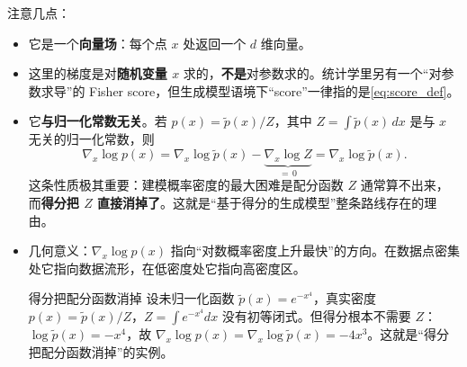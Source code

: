 注意几点：
\begin{itemize}
\item 它是一个\textbf{向量场}：每个点 $x$ 处返回一个 $d$ 维向量。
\item 这里的梯度是对\textbf{随机变量 $x$} 求的，\textbf{不是}对参数求的。统计学里另有一个“对参数求导”的 Fisher score，但生成模型语境下“score”一律指的是\eqref{eq:score_def}。
\item 它\textbf{与归一化常数无关}。若 $p(x) = \tilde{p}(x) / Z$，其中 $Z = \int \tilde p(x)\,dx$ 是与 $x$ 无关的归一化常数，则
\begin{equation}
\nabla_x \log p(x) = \nabla_x \log \tilde{p}(x) - \underbrace{\nabla_x \log Z}_{=\,0} = \nabla_x \log \tilde{p}(x).
\end{equation}
这条性质极其重要：建模概率密度的最大困难是配分函数 $Z$ 通常算不出来，而\textbf{得分把 $Z$ 直接消掉了}。这就是“基于得分的生成模型”整条路线存在的理由。
\item 几何意义：$\nabla_x \log p(x)$ 指向“对数概率密度上升最快”的方向。在数据点密集处它指向数据流形，在低密度处它指向高密度区。
\begin{example}{得分把配分函数消掉}{}
    设未归一化函数 $\tilde p(x)=e^{-x^4}$，真实密度 $p(x)=\tilde p(x)/Z$，$Z=\int e^{-x^4}dx$ 没有初等闭式。但得分根本不需要 $Z$：$\log\tilde p(x)=-x^4$，故 $\nabla_x\log p(x)=\nabla_x\log\tilde p(x)=-4x^3$。这就是“得分把配分函数消掉”的实例。
\end{example}
\end{itemize}


